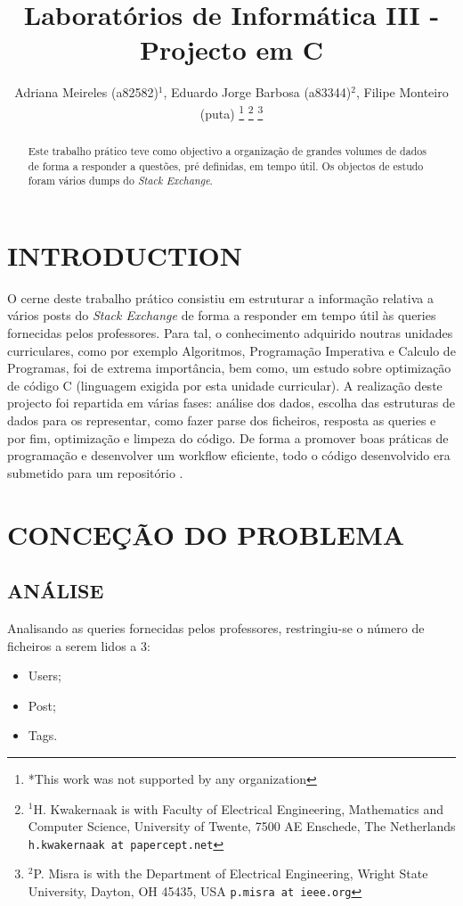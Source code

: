 \documentclass[letterpaper, 10 pt, conference]{IEEEtran}  %
\title{\LARGE \bf
Laboratórios de Informática III - Projecto em C
}
\author{Adriana Meireles (a82582)$^{1}$, Eduardo Jorge Barbosa (a83344)$^{2}$, Filipe Monteiro (puta)%
\thanks{*This work was not supported by any organization}%
\thanks{$^{1}$H. Kwakernaak is with Faculty of Electrical Engineering, Mathematics and Computer Science,
        University of Twente, 7500 AE Enschede, The Netherlands
        {\tt\small h.kwakernaak at papercept.net}}%
\thanks{$^{2}$P. Misra is with the Department of Electrical Engineering, Wright State University,
        Dayton, OH 45435, USA
        {\tt\small p.misra at ieee.org}}%
}
\begin{document}
\maketitle
\thispagestyle{empty}
\pagestyle{empty}


\begin{abstract}

Este trabalho prático teve como objectivo a organização de grandes volumes de dados de forma a responder a questões, pré definidas, em tempo útil. Os objectos de estudo foram vários dumps do \textit{Stack Exchange}.

\end{abstract}


\section{INTRODUCTION}

O cerne deste trabalho prático consistiu em estruturar a informação relativa a vários posts do \textit{Stack Exchange} de forma a responder em tempo útil às queries fornecidas pelos professores. Para tal, o conhecimento adquirido noutras unidades curriculares, como por exemplo Algoritmos, Programação Imperativa e Calculo de Programas, foi de extrema importância, bem como, um estudo sobre optimização de código C (linguagem exigida por esta unidade curricular). A realização deste projecto foi repartida em várias fases: análise dos dados, escolha das estruturas de dados para os representar, como fazer parse dos ficheiros, resposta as queries e por fim, optimização e limpeza do código. De forma a promover boas práticas de programação e desenvolver um workflow eficiente, todo o código desenvolvido era submetido para um repositório .

\section{CONCEÇÃO DO PROBLEMA}

\subsection{ANÁLISE}

Analisando as queries fornecidas pelos professores, restringiu-se o número de ficheiros a serem lidos a 3:

\begin{itemize}
\item Users;
\item Post;
\item Tags.
\end{itemize}
\end{document}
